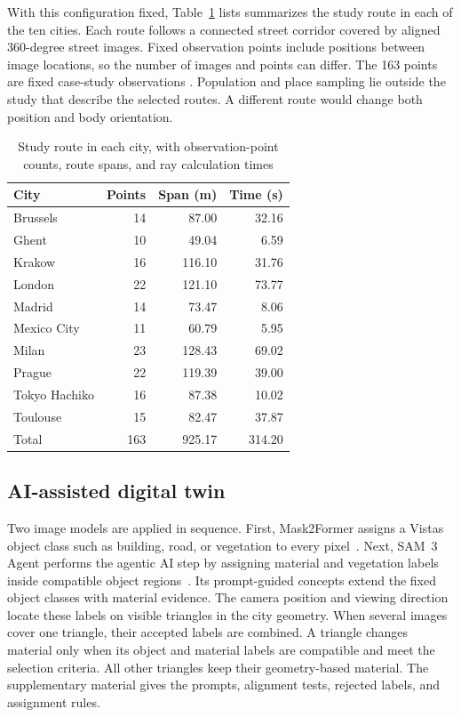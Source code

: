 \documentclass{IEEEoj}
\providecommand{\DIFadd}[1]{{\protect\color{blue} \sf #1}} %
\providecommand{\DIFdel}[1]{{\protect\color{red} \scriptsize #1}} %
\providecommand{\DIFaddbegin}{} %
\providecommand{\DIFaddend}{} %
\providecommand{\DIFdelbegin}{} %
\providecommand{\DIFdelend}{} %
\begin{document}
\DIFaddbegin \DIFadd{With this configuration fixed, }\DIFaddend Table~\ref{tab:routes} \DIFdelbegin \DIFdel{lists }\DIFdelend \DIFaddbegin \DIFadd{summarizes }\DIFaddend the study
route in each of the ten cities. Each
route follows a connected street corridor covered by aligned 360-degree street
images. Fixed observation points include positions between image locations, so
the number of images and points can differ. The 163 points are fixed case-study
observations \DIFdelbegin \DIFdel{. Population and place sampling lie outside the study}\DIFdelend \DIFaddbegin \DIFadd{that describe the selected routes}\DIFaddend . A different route would change
both position and body orientation.

\begin{table}[!t]
  \caption{Study route in each city, with observation-point counts, route spans, and ray calculation times}
  \label{tab:routes}
  \centering
  \begin{tabular}{lrrr}
    \toprule
    City & Points & Span (m) & Time (s) \\
    \midrule
    Brussels & 14 & 87.00 & 32.16 \\
    Ghent & 10 & 49.04 & 6.59 \\
    Krakow & 16 & 116.10 & 31.76 \\
    London & 22 & 121.10 & 73.77 \\
    Madrid & 14 & 73.47 & 8.06 \\
    Mexico City & 11 & 60.79 & 5.95 \\
    Milan & 23 & 128.43 & 69.02 \\
    Prague & 22 & 119.39 & 39.00 \\
    Tokyo Hachiko & 16 & 87.38 & 10.02 \\
    Toulouse & 15 & 82.47 & 37.87 \\
    \midrule
    Total & 163 & 925.17 & 314.20 \\
    \bottomrule
  \end{tabular}
\end{table}

\subsection{AI-assisted digital twin}
\label{sec:digital-twin}

Two image models are applied in sequence. \DIFaddbegin \DIFadd{First, }\DIFaddend Mask2Former assigns a Vistas object
class such as building, road, or vegetation to every pixel~\cite{mask2former,vistas}.
\DIFaddbegin \DIFadd{Next, }\DIFaddend SAM~3 Agent performs the agentic AI step by assigning material and vegetation
labels inside compatible object regions~\cite{sam3}. \DIFaddbegin \DIFadd{Its prompt-guided concepts
extend the fixed object classes with material evidence. }\DIFaddend The camera position and
viewing direction locate these labels on visible triangles in the city geometry. When several images cover one
triangle, their accepted labels are combined. A triangle changes material only
when its object and material labels are compatible and meet the selection
criteria. All other triangles keep their geometry-based material. The
supplementary material gives the prompts, alignment tests, rejected labels, and
assignment rules.
\end{document}
